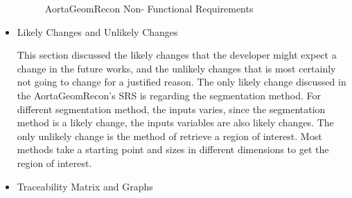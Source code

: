 \begin{itemize}
\begin{figure}[H]
    \centering
    \caption[AortaGeomRecon Non- Functional Requirements]{AortaGeomRecon Non- Functional Requirements}
    \label{fig_agr_nfr}
\end{figure}

\item Likely Changes and Unlikely Changes

This section discussed the likely changes that the developer might expect a change in the future works, and the unlikely changes that is most certainly not going to change for a justified reason. The only likely change discussed in the AortaGeomRecon's SRS is regarding the segmentation method. For different segmentation method, the inputs varies, since the segmentation method is a likely change, the inputs variables are also likely changes. The only unlikely change is the method of retrieve a region of interest. Most methods take a starting point and sizes in different dimensions to get the region of interest.

\item Traceability Matrix and Graphs


\end{itemize}
